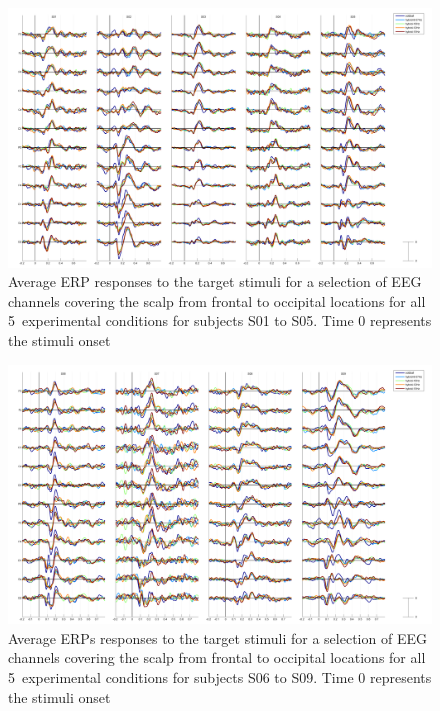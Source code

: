 %
\begin{figure}[t]
\centering
\includegraphics[width=\textwidth]{pix/targetERPs_1}
\caption{Average ERP responses to the target stimuli for a selection of EEG channels covering the scalp from frontal to occipital locations for all 5~experimental conditions for subjects S01 to S05. Time 0 represents the stimuli onset}
\label{fig:ERP_1}
\end{figure}


\begin{figure}[t]
\centering
\includegraphics[width=\textwidth]{pix/targetERPs_2}
\caption{Average ERPs responses to the target stimuli for a selection of EEG channels covering the scalp from frontal to occipital locations for all 5~experimental conditions for subjects S06 to S09. Time 0 represents the stimuli onset}
\label{fig:ERP_2}
\end{figure}

